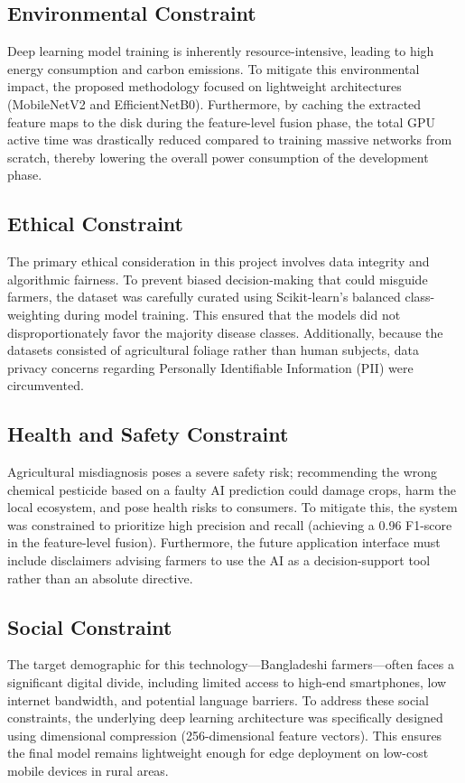 \subsection{Environmental Constraint}
Deep learning model training is inherently resource-intensive, leading to high energy consumption and carbon emissions. To mitigate this environmental impact, the proposed methodology focused on lightweight architectures (MobileNetV2 and EfficientNetB0). Furthermore, by caching the extracted feature maps to the disk during the feature-level fusion phase, the total GPU active time was drastically reduced compared to training massive networks from scratch, thereby lowering the overall power consumption of the development phase.

\subsection{Ethical Constraint}
The primary ethical consideration in this project involves data integrity and algorithmic fairness. To prevent biased decision-making that could misguide farmers, the dataset was carefully curated using Scikit-learn’s balanced class-weighting during model training. This ensured that the models did not disproportionately favor the majority disease classes. Additionally, because the datasets consisted of agricultural foliage rather than human subjects, data privacy concerns regarding Personally Identifiable Information (PII) were circumvented.

\subsection{Health and Safety Constraint}
Agricultural misdiagnosis poses a severe safety risk; recommending the wrong chemical pesticide based on a faulty AI prediction could damage crops, harm the local ecosystem, and pose health risks to consumers. To mitigate this, the system was constrained to prioritize high precision and recall (achieving a 0.96 F1-score in the feature-level fusion). Furthermore, the future application interface must include disclaimers advising farmers to use the AI as a decision-support tool rather than an absolute directive.

\subsection{Social Constraint}
The target demographic for this technology—Bangladeshi farmers—often faces a significant digital divide, including limited access to high-end smartphones, low internet bandwidth, and potential language barriers. To address these social constraints, the underlying deep learning architecture was specifically designed using dimensional compression (256-dimensional feature vectors). This ensures the final model remains lightweight enough for edge deployment on low-cost mobile devices in rural areas.

